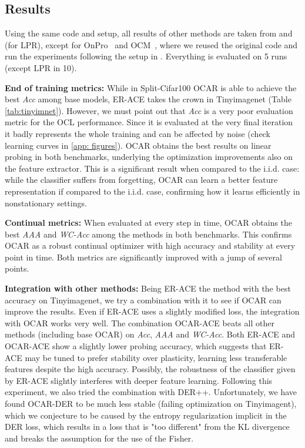 \subsection{Results}

Using the same code and setup, all results of other methods are taken from \cite{DBLP:conf/iccvw/Soutif-Cormerais23} and \cite{yoo2024layerwise} (for LPR), except for OnPro~\cite{wei2023online} and OCM~\cite{guo2022online}, where we reused the original code and run the experiments following the setup in \cite{DBLP:conf/iccvw/Soutif-Cormerais23,yoo2024layerwise}. Everything is evaluated on 5 runs (except LPR in 10).

\textbf{End of training metrics:} While in Split-Cifar100 OCAR is able to achieve the best \textit{Acc} among base models, ER-ACE takes the crown in Tinyimagenet (Table \ref{tab:tinyimnet}). However, we must point out that \textit{Acc} is a very poor evaluation metric for the OCL performance. Since it is evaluated at the very final iteration it badly represents the whole training and can be affected by noise (check learning curves in \ref{app: figures}). OCAR obtains the best results on linear probing in both benchmarks, underlying the optimization improvements also on the feature extractor. This is a significant result when compared to the i.i.d. case: while the classifier suffers from forgetting, OCAR can learn a better feature representation if compared to the i.i.d. case, confirming how it learns efficiently in nonstationary settings.

\textbf{Continual metrics:} When evaluated at every step in time, OCAR obtains the best \textit{AAA} and \textit{WC-Acc} among the methods in both benchmarks. This confirms OCAR as a robust continual optimizer with high accuracy and stability at every point in time. Both metrics are significantly improved with a jump of several points. 

\textbf{Integration with other methods:} Being ER-ACE the method with the best accuracy on Tinyimagenet, we try a combination with it to see if OCAR can improve the results. Even if ER-ACE uses a slightly modified loss, the integration with OCAR works very well. The combination OCAR-ACE beats all other methods (including base OCAR) on \textit{Acc}, \textit{AAA} and \textit{WC-Acc}. Both ER-ACE and OCAR-ACE show a slightly lower probing accuracy, which suggests that ER-ACE may be tuned to prefer stability over plasticity, learning less transferable features despite the high accuracy. Possibly, the robustness of the classifier given by ER-ACE slightly interferes with deeper feature learning. Following this experiment, we also tried the combination with DER++. Unfortunately, we have found OCAR-DER to be much less stable (failing optimization on Tinyimagent), which we conjecture to be caused by the entropy regularization implicit in the DER loss, which results in a loss that is "too different" from the KL divergence and breaks the assumption for the use of the Fisher.

